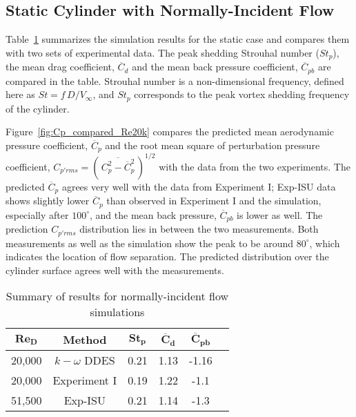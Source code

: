 \documentclass[12pt,authoryear]{elsarticle}
\begin{document}
\subsection{Static Cylinder with Normally-Incident Flow}
\label{sec:normally_incident}


Table~\ref{tab:comparisonRe20k} summarizes the simulation results for the
static case and compares them with two sets of experimental
data. The peak shedding Strouhal number ($St_p$), the mean drag coefficient,
$\overline{C}_d$ and the mean back pressure coefficient, $\overline{C}_{pb}$
are compared in the table. Strouhal number is a non-dimensional frequency,
defined here as $St = f\,D/V_\infty$, and $St_p$ corresponds to the peak vortex
shedding frequency of the cylinder.

Figure~\ref{fig:Cp_compared_Re20k} compares the predicted mean aerodynamic
pressure coefficient, $\overline{C}_p$ and the root mean square of perturbation
pressure coefficient, $C_{p'rms} = \left(\,\overline{C^2_p -
\overline{C}^2_p}\,\right)^{1/2}$ with the data from the two experiments. The
predicted $\overline{C}_p$ agrees very well with the data from Experiment I;
Exp-ISU data shows slightly lower $\overline{C}_p$ than observed in
Experiment I and the simulation, especially after $100^\circ$, and the mean
back pressure, $\overline{C}_{pb}$ is lower as well. The prediction
$C_{p'rms}$ distribution lies in between the two measurements. Both
measurements as well as the simulation show the peak to be around $80^\circ$,
which indicates the location of flow separation. The
predicted distribution over the cylinder surface agrees well with the
measurements.
%
\begin{table}[htb!]
  \caption{Summary of results for normally-incident flow simulations} 
  \label{tab:comparisonRe20k} 
  \begin{center}
  \begin{tabular}{c|c|c|c|c|c}
      $\boldsymbol{Re_D}$ & \textbf{Method} & $\boldsymbol{St_p}$ & $\boldsymbol{\overline{C}_d}$ & $\boldsymbol{\overline{C}_{pb}}$ \\ \hline
      \hline
      20,000 & $k-\omega$ DDES & 0.21 & 1.13 & -1.16 \\ \hline
      20,000 & Experiment I    & 0.19 & 1.22 & -1.1  \\ \hline
      51,500 & Exp-ISU   & 0.21 & 1.14 & -1.3  \\ \hline
      \hline
  \end{tabular}
  \end{center}
\end {table}
\end{document}
